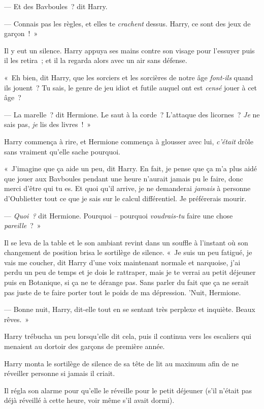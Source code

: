 --- Et des Bavboules~? dit Harry.

--- Connais pas les règles, et elles te \emph{crachent} dessus.
Harry, ce sont des jeux de garçon~!~»

Il y eut un silence.
Harry appuya ses mains contre son visage pour l'essuyer puis il les retira~; et il la regarda alors avec un air sans défense.

«~Eh bien, dit Harry, que les sorciers et les sorcières de notre âge \emph{font-ils} quand ils jouent~?
Tu sais, le genre de jeu idiot et futile auquel ont est \emph{censé} jouer à cet âge~?

--- La marelle~? dit Hermione.
Le saut à la corde~?
L'attaque des licornes~?
\emph{Je} ne sais pas, \emph{je} lis des livres~!~»

Harry commença à rire, et Hermione commença à glousser avec lui, \emph{c'était} drôle sans vraiment qu'elle sache pourquoi.

«~J'imagine que ça aide un peu, dit Harry.
En fait, je pense que ça m'a plus aidé que jouer aux Bavboules pendant une heure n'aurait jamais pu le faire, donc merci d'être qui tu es.
Et quoi qu'il arrive, je ne demanderai \emph{jamais} à personne d'Oublietter tout ce que je sais sur le calcul différentiel.
Je préférerais mourir.

--- \emph{Quoi~?} dit Hermione.
Pourquoi -- pourquoi \emph{voudrais-tu} faire une chose \emph{pareille}~?~»

Il se leva de la table et le son ambiant revint dans un souffle à l'instant où son changement de position brisa le sortilège de silence.
«~Je suis un peu fatigué, je vais me coucher, dit Harry d'une voix maintenant normale et narquoise, j'ai perdu un peu de temps et je dois le rattraper, mais je te verrai au petit déjeuner puis en Botanique, si ça ne te dérange pas.
Sans parler du fait que ça ne serait pas juste de te faire porter tout le poids de ma dépression.
'Nuit, Hermione.

--- Bonne nuit, Harry, dit-elle tout en se sentant très perplexe et inquiète.
Beaux rêves.~»

Harry trébucha un peu lorsqu'elle dit cela, puis il continua vers les escaliers qui menaient au dortoir des garçons de première année.

\later

Harry monta le sortilège de silence de sa tête de lit au maximum afin de ne réveiller personne si jamais il criait.

Il régla son alarme pour qu'elle le réveille pour le petit déjeuner (s'il n'était pas déjà réveillé à cette heure, voir même s'il avait dormi).

